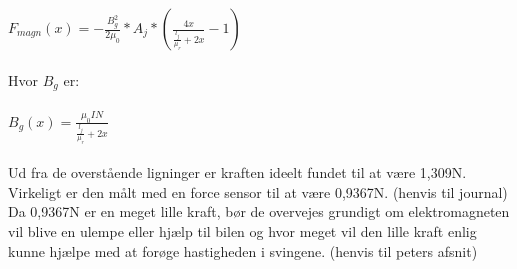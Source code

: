 $F_{magn}(x)=-{\frac{B^{2}_{g}}{2\mu_{0}}}* {A_{j}}* (\frac{4x}{{\frac{l_{j}}{\mu_{r}}}+2x}-1) $
\\
\\
Hvor $B_{g}$ er:
\\
\\
$ B_{g}(x)=\frac{\mu_{0}IN}{{\frac{l_{j}}{\mu_{r}}}+2x} $
\\
\\
Ud fra de overstående ligninger er kraften ideelt fundet til at være 1,309N. Virkeligt er den målt med en force sensor til at være 0,9367N. (henvis til journal) \\
Da 0,9367N er en meget lille kraft, bør de overvejes grundigt om elektromagneten vil blive en ulempe eller hjælp til bilen og hvor meget vil den lille kraft enlig kunne hjælpe med at forøge hastigheden i svingene. (henvis til peters afsnit)\\
